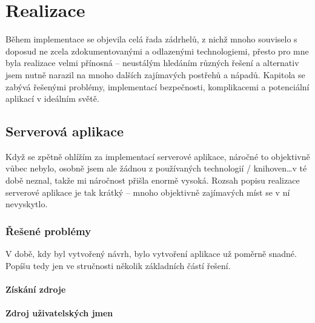 
\chapter{Realizace}
Během implementace se objevila celá řada zádrhelů, z nichž mnoho souviselo s doposud ne zcela zdokumentovanými a odlazenými technologiemi, přesto pro mne byla realizace velmi přínosná -- neustálým hledáním různých řešení a alternativ jsem nutně narazil na mnoho dalších zajímavých postřehů a nápadů. Kapitola se zabývá řešenými problémy, implementací bezpečnosti, komplikacemi a potenciální aplikací v ideálním světě.

\section{Serverová aplikace}
Když se zpětně ohlížím za implementací serverové aplikace, náročné to objektivně vůbec nebylo, osobně jsem ale žádnou z používaných technologií / knihoven\dots v té době neznal, takže mi náročnost přišla enormě vysoká. Rozsah popisu realizace serverové aplikace je tak krátký -- mnoho objektivně zajímavých míst se v ní nevyskytlo.

\subsection{Řešené problémy}
V době, kdy byl vytvořený návrh, bylo vytvoření aplikace už poměrně snadné. Popíšu tedy jen ve stručnosti několik základních částí řešení.

\subsubsection{Získání zdroje}


\subsubsection{Zdroj uživatelských jmen}


